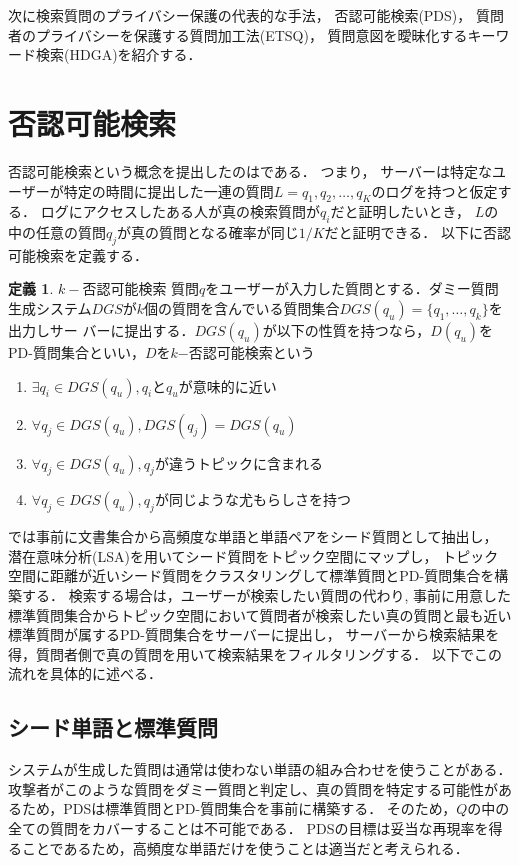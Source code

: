 \documentclass[master]{suribt}
\theoremstyle{definition}
\newtheorem{defi}[thm]{定義}
\begin{document}
 次に検索質問のプライバシー保護の代表的な手法，
 否認可能検索(PDS)\cite{providing2009}，
 質問者のプライバシーを保護する質問加工法(ETSQ)\cite{embellishing2010}，
 質問意図を曖昧化するキーワード検索(HDGA)\cite{masking2014}を紹介する．
 
 \section{否認可能検索}\label{s:PDS}
 否認可能検索という概念を提出したのは\cite{}である．
 つまり， サーバーは特定なユーザーが特定の時間に提出した一連の質問$L = {q_1, q_2, \dots , q_K}$のログを持つと仮定する． 
 ログにアクセスしたある人が真の検索質問が$q_i$だと証明したいとき， $L$の中の任意の質問$q_j$が真の質問となる確率が同じ$1/K$だと証明できる．
 以下に否認可能検索を定義する．
 \begin{defi}{$k−$否認可能検索}
 	質問$q$をユーザーが入力した質問とする．ダミー質問生成システム$DGS$が$k$個の質問を含んでいる質問集合$DGS(q_u)=\{q_1, \dots , q_k\}$を出力しサー
	バーに提出する．$DGS(q_u)$が以下の性質を持つなら，$D(q_u)$をPD-質問集合といい，$D$を$k$−否認可能検索という
	\begin{enumerate}
	\item $\exists q_i \in DGS(q_u),q_i$と$q_u$が意味的に近い
	\item $\forall q_j \in DGS(q_u),DGS(q_j) = DGS(q_u)$
	\item $\forall q_j \in DGS(q_u),q_j$が違うトピックに含まれる
	\item $\forall q_j \in DGS(q_u),q_j$が同じような尤もらしさを持つ
	\end{enumerate}
  \end{defi}
 \cite{providing2009}では事前に文書集合から高頻度な単語と単語ペアをシード質問として抽出し，
 潜在意味分析(LSA)\cite{}を用いてシード質問をトピック空間にマップし，
 トピック空間に距離が近いシード質問をクラスタリングして標準質問とPD-質問集合を構築する．
 検索する場合は，ユーザーが検索したい質問の代わり,
 事前に用意した標準質問集合からトピック空間において質問者が検索したい真の質問と最も近い標準質問が属するPD-質問集合をサーバーに提出し，
 サーバーから検索結果を得，質問者側で真の質問を用いて検索結果をフィルタリングする．
 以下でこの流れを具体的に述べる．
 \subsection{シード単語と標準質問}
 システムが生成した質問は通常は使わない単語の組み合わせを使うことがある．
 攻撃者がこのような質問をダミー質問と判定し、真の質問を特定する可能性があるため，PDSは標準質問とPD-質問集合を事前に構築する．
 そのため，$Q$の中の全ての質問をカバーすることは不可能である．
 PDSの目標は妥当な再現率を得ることであるため，高頻度な単語だけを使うことは適当だと考えられる．
 
\end{document}
